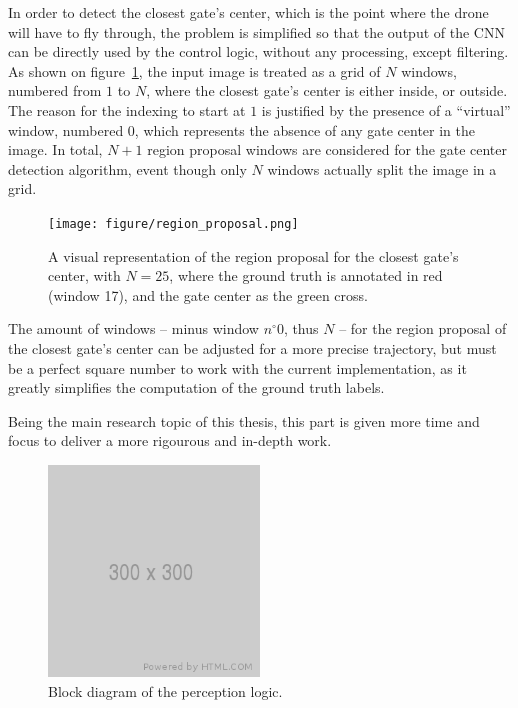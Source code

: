 In order to detect the closest gate's center, which is the point where the
drone will have to fly through, the problem is simplified so that the output of
the CNN can be directly used by the control logic, without any processing,
except filtering. As shown on figure~\ref{fig:regionproposal}, the input image
is treated as a grid of $N$ windows, numbered from $1$ to $N$, where the
closest gate's center is either inside, or outside. The reason for the indexing
to start at $1$ is justified by the presence of a ``virtual'' window, numbered
$0$, which represents the absence of any gate center in the image. In total,
$N+1$ region proposal windows are considered for the gate center detection
algorithm, event though only $N$ windows actually split the image in a grid.

\begin{figure}[h!]
	\center
	\texttt{[image: figure/region\_proposal.png]}
	\caption[Visual representation of the region proposal grid]{A visual
		representation of the region proposal for the closest gate's center, with
		$N=25$, where the ground truth is annotated in red (window 17), and the gate
		center as the green cross.}
	\label{fig:regionproposal}
\end{figure}

The amount of windows -- minus window $n^{\circ}0$, thus $N$ -- for the region
proposal of the closest gate's center can be adjusted for a more precise
trajectory, but must be a perfect square number to work with the current
implementation, as it greatly simplifies the computation of the ground truth
labels.

Being the main research topic of this thesis, this part is given more time and
focus to deliver a more rigourous and in-depth work.\\

\begin{figure}[h]
	\centering
	\includegraphics[width=0.5\textwidth]{figure/300x300.png}
	\caption{Block diagram of the perception logic.}
	\label{fig:perception-block}
\end{figure}

